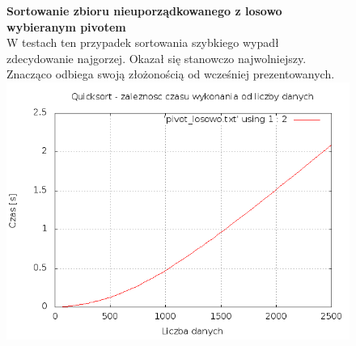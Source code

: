 \documentclass[a4paper,11pt]{report}
\begin{document}
\begin{figure}
  \begin{center}
  \textbf{Sortowanie zbioru nieuporządkowanego z losowo wybieranym pivotem}
  \\W testach ten przypadek sortowania szybkiego wypadł zdecydowanie najgorzej. Okazał się stanowczo najwolniejszy. Znacząco odbiega swoją złożonością od wcześniej prezentowanych. 
  \\
  \includegraphics[scale=0.5]{./pivot_losowo.png}
    \label{fig:}
  \end{center}
\end{figure}
\end{document}
